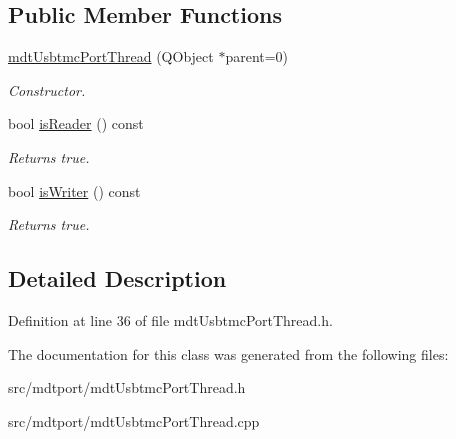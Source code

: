 \subsection*{Public Member Functions}
\begin{DoxyCompactItemize}
\item 
\hypertarget{classmdt_usbtmc_port_thread_afc02cdf1c178b56ff42fdf997df1014c}{
\hyperlink{classmdt_usbtmc_port_thread_afc02cdf1c178b56ff42fdf997df1014c}{mdtUsbtmcPortThread} (QObject $\ast$parent=0)}
\label{classmdt_usbtmc_port_thread_afc02cdf1c178b56ff42fdf997df1014c}

\begin{DoxyCompactList}\small\item\em Constructor. \end{DoxyCompactList}\item 
\hypertarget{classmdt_usbtmc_port_thread_a27c115427b49d5ae988c9f9c9a5e402a}{
bool \hyperlink{classmdt_usbtmc_port_thread_a27c115427b49d5ae988c9f9c9a5e402a}{isReader} () const }
\label{classmdt_usbtmc_port_thread_a27c115427b49d5ae988c9f9c9a5e402a}

\begin{DoxyCompactList}\small\item\em Returns true. \end{DoxyCompactList}\item 
\hypertarget{classmdt_usbtmc_port_thread_a4c58b7140f0483a19723b14487907423}{
bool \hyperlink{classmdt_usbtmc_port_thread_a4c58b7140f0483a19723b14487907423}{isWriter} () const }
\label{classmdt_usbtmc_port_thread_a4c58b7140f0483a19723b14487907423}

\begin{DoxyCompactList}\small\item\em Returns true. \end{DoxyCompactList}\end{DoxyCompactItemize}


\subsection{Detailed Description}


Definition at line 36 of file mdtUsbtmcPortThread.h.



The documentation for this class was generated from the following files:\begin{DoxyCompactItemize}
\item 
src/mdtport/mdtUsbtmcPortThread.h\item 
src/mdtport/mdtUsbtmcPortThread.cpp\end{DoxyCompactItemize}
